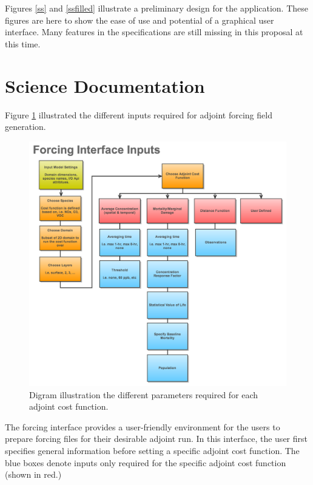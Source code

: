 \documentclass{article}
\begin{document}
Figures \ref{ss} and \ref{ssfilled} illustrate a preliminary design for the
application.  These figures are here to show the ease of use and potential of a
graphical user interface.  Many features in the specifications are still
missing in this proposal at this time.

\section{Science Documentation}

Figure \ref{inputs} illustrated the different inputs required for adjoint forcing field generation.

\begin{figure}
	\centering
	\includegraphics[width=1.2\textwidth]{Forcing-Interface-Chart.png}
	\caption{Digram illustration the different parameters required for each adjoint cost function.}
	\label{inputs}
\end{figure}


The forcing interface provides a user-friendly environment for the users to prepare forcing files for their desirable adjoint run. In this interface, the user first specifies general information before setting a specific adjoint cost function. The blue boxes denote inputs only required for the specific adjoint cost function (shown in red.)
\end{document}
